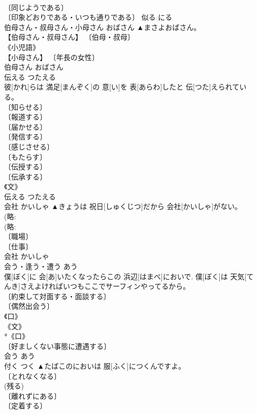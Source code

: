 \documentclass[8pt]{extreport}
\begin{document}
\begin{CJK}{UTF8}{min}
\\	〔同じようである〕 
\\	〔印象どおりである・いつも通りである〕	似る	にる	
\\	伯母さん・叔母さん・小母さん	おばさん	▲まさよおばさん。	
\\	【伯母さん・叔母さん】 〔伯母・叔母〕 
\\	《小児語》 
\\	【小母さん】 〔年長の女性〕 
\\	伯母さん	おばさん	
\\	伝える	つたえる	
\\	彼[かれ]らは 満足[まんぞく]の 意[い]を 表[あらわ]したと 伝[つた]えられている。	
\\	〔知らせる〕 
\\	〔報道する〕 
\\	〔届かせる〕 
\\	〔発信する〕 
\\	〔感じさせる〕 
\\	〔もたらす〕 
\\	〔伝授する〕 
\\	〔伝承する〕 
\\	《文》 
\\	伝える	つたえる	
\\	会社	かいしゃ	▲きょうは 祝日[しゅくじつ]だから 会社[かいしゃ]がない。	
\\	(略: 
\\	(略: 
\\	〔職場〕 
\\	〔仕事〕 
\\	会社	かいしゃ	
\\	会う・逢う・遭う	あう	
\\	僕[ぼく]に 会[あ]いたくなったらこの 浜辺[はまべ]においで. 僕[ぼく]は 天気[てんき]さえよければいつもここでサーフィンやってるから。	
\\	〔約束して対面する・面談する〕 
\\	〔偶然出会う〕 
\\	《口》 
\\	《文》 
\\	*《口》 
\\	〔好ましくない事態に遭遇する〕 
\\	会う	あう	
\\	付く	つく	▲たばこのにおいは 服[ふく]につくんですよ。	
\\	〔とれなくなる〕 
\\	(残る) 
\\	〔離れずにある〕 
\\	〔定着する〕 

\end{CJK}
\end{document}
